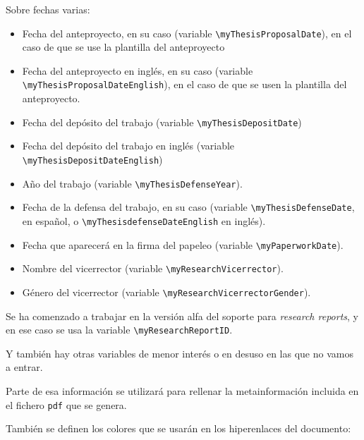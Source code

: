 \documentclass[spanish,openright]{book}
\begin{document}
Sobre fechas varias:

\begin{itemize}
  
\item Fecha del anteproyecto, en su caso (variable
  \texttt{\textbackslash{}myThesisProposalDate}), en el caso de que se
  use la plantilla del anteproyecto
\item Fecha del anteproyecto en inglés, en su caso (variable
  \texttt{\textbackslash{}myThesisProposalDateEnglish}), en el caso de
  que se usen la plantilla del anteproyecto.

\item Fecha del depósito del trabajo (variable
  \texttt{\textbackslash{}myThesisDepositDate})
\item Fecha del depósito del trabajo en inglés (variable
  \texttt{\textbackslash{}myThesisDepositDateEnglish})

\item Año del trabajo (variable
  \texttt{\textbackslash{}myThesisDefenseYear}).
\item Fecha de la defensa del trabajo, en su caso (variable
  \texttt{\textbackslash{}myThesisDefenseDate}, en español, o
  \texttt{\textbackslash{}myThesisdefenseDateEnglish} en inglés).

\item Fecha que aparecerá en la firma del papeleo (variable
  \texttt{\textbackslash{}myPaperworkDate}).
  
\item Nombre del vicerrector (variable
  \texttt{\textbackslash{}myResearchVicerrector}).
\item Género del vicerrector (variable
  \texttt{\textbackslash{}myResearchVicerrectorGender}).
\end{itemize}

Se ha comenzado a trabajar en la versión alfa del soporte para
\textit{research reports}, y en ese caso se usa la variable
\texttt{\textbackslash{}myResearchReportID}.

Y también hay otras variables de menor interés o en desuso en las que
no vamos a entrar.

Parte de esa información se utilizará para rellenar la metainformación
incluida en el fichero \texttt{pdf} que se genera.


También se definen los colores que se usarán en los hiperenlaces del
documento:
\end{document}
